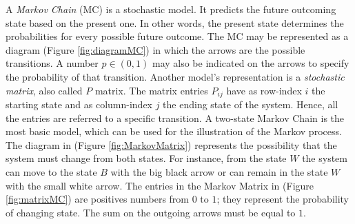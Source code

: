 \documentclass[class=article, crop=false]{standalone}
\begin{document}
\label{chap:MarkovChain}

A \emph{Markov Chain} (MC) is a stochastic model. 
It predicts the future outcoming state based on the present one. 
In other words, the present state determines the probabilities for every possible future outcome. 
The MC may be represented as a diagram (Figure \ref{fig:diagramMC}) \cite{MC_Gagniuc} in which the arrows are the possible transitions. 
A number $p \in (0,1)$ may also be indicated on the arrows to specify the probability of that transition. 
Another model’s representation is a \emph{stochastic matrix}, also called $P$ matrix. 
The matrix entries $P_{ij}$ have as row-index $i$ the starting state and as column-index $j$ the ending state of the system. 
Hence, all the entries are referred to a specific transition. 
A two-state Markov Chain is the most basic model, which can be used for the illustration of the Markov process. 
The diagram in (Figure \ref{fig:MarkovMatrix}) represents the possibility that the system must change from both states. 
For instance, from the state $W$ the system can move to the state $B$ with the big black arrow or can remain in the state $W$ with the small white arrow.
The entries in the Markov Matrix in (Figure \ref{fig:matrixMC}) are positives numbers from $0$ to $1$; they represent the probability of changing state. 
The sum on the outgoing arrows must be equal to $1$.
\end{document}

